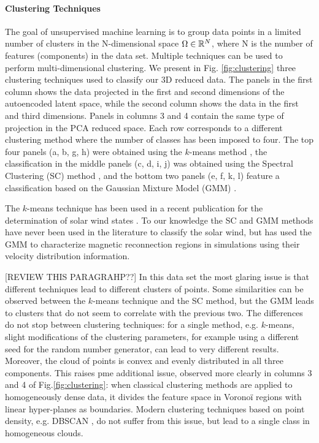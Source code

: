 \paragraph{Clustering Techniques}
\label{sec:clustering}
The goal of unsupervised machine learning is to group data points in a limited number of clusters in the N-dimensional space $\Omega\in\Bbb R^N$, where N is the number of features (components) in the data set. Multiple techniques can be used to perform multi-dimensional clustering. We present in Fig. \ref{fig:clustering} three clustering techniques used to classify our 3D reduced data. The panels in the first column shows the data projected in the first and second dimensions of the autoencoded latent space, while the second column shows the data in the first and third dimensions. Panels in columns 3 and 4 contain the same type of projection in the PCA reduced space. Each row corresponds to a different clustering method where the number of classes has been imposed to four. The top four panels (a, b, g, h) were obtained using the $k$-means method \citep{[REF??]}, the classification in the middle panels (c, d, i, j) was obtained using the Spectral Clustering (SC) method \citep{[REF??]}, and the bottom two panels (e, f, k, l) feature a classification based on the Gaussian Mixture Model (GMM) \citep{[REF??]}.

The $k$-means technique has been used in a recent publication for the determination of solar wind states \citep{Roberts2020}. To our knowledge the SC and GMM methods have never been used in the literature to classify the solar wind, but \citep{Dupuis2020} has used the GMM to characterize magnetic reconnection regions in simulations using their velocity distribution information.

[REVIEW THIS PARAGRAHP??]
In this data set the most glaring issue is that different techniques lead to different clusters of points. Some similarities can be observed between the $k$-means technique and the SC method, but the GMM leads to clusters that do not seem to correlate with the previous two. The differences do not stop between clustering techniques: for a single method, e.g. $k$-means, slight modifications of the clustering parameters, for example using a different seed for the random number generator, can lead to very different results. Moreover, the cloud of points is convex and evenly distributed in all three components. This raises pme additional issue, observed more clearly in columns 3 and 4 of Fig.\ref{fig:clustering}: when classical clustering methods are applied to homogeneously dense data, it divides the feature space in Vorono\"i regions with linear hyper-planes as boundaries. Modern clustering techniques based on point density, e.g. DBSCAN \citep{[REF newDBSCAN paper??]}, do not suffer from this issue, but lead to a single class in homogeneous clouds.


